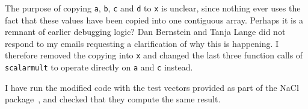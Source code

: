 \documentclass[manuscript]{acmart}
\begin{document}
\begin{itemize}
        The purpose of copying \verb|a|, \verb|b|, \verb|c| and \verb|d| to \verb|x| is unclear, since nothing ever uses the fact that these values have been copied into one contiguous array.
        Perhaps it is a remnant of earlier debugging logic?
        Dan Bernstein and Tanja Lange did not respond to my emails requesting a clarification of why this is happening.
        I therefore removed the copying into \verb|x| and changed the last three function calls of \verb|scalarmult| to operate directly on \verb|a| and \verb|c| instead.
\end{itemize}

I have run the modified code with the test vectors provided as part of the NaCl package~\cite{NaCl}, and checked that they compute the same result.
\end{document}
